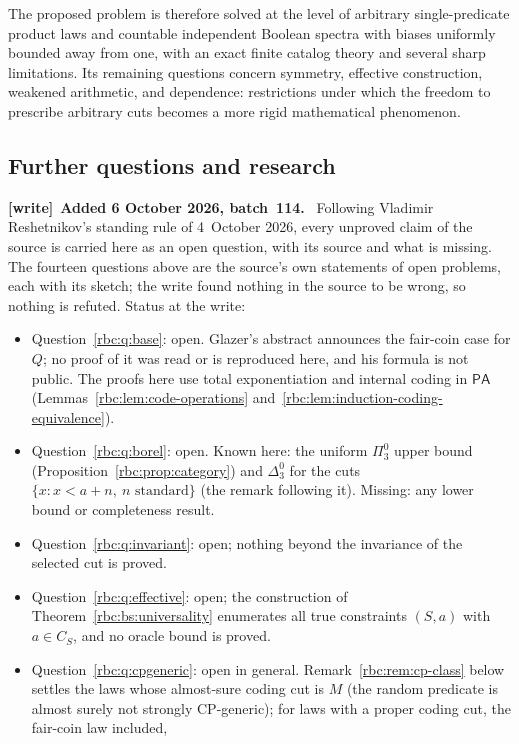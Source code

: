 \documentclass[11pt]{article}
\numberwithin{equation}{section}
\theoremstyle{definition}
\theoremstyle{remark}
\newcommand{\PA}{\mathsf{PA}}
\newenvironment{writenote}[1][]{\par\smallskip\begingroup\small
 \noindent\textbf{[write]}\if\relax\detokenize{#1}\relax\else~\textbf{#1.}\fi\ }%
 {\par\endgroup\smallskip}
\begin{document}
The proposed problem is therefore solved at the level of arbitrary
single-predicate product laws and countable independent Boolean spectra
with biases uniformly bounded away from one,
with an exact finite catalog theory and several sharp limitations. Its
remaining questions concern symmetry, effective construction, weakened
arithmetic, and dependence: restrictions under which the freedom to
prescribe arbitrary cuts becomes a more rigid mathematical phenomenon.

\subsection{Further questions and research}\label{rbc:sec:further}
\begin{writenote}[Added 6 October 2026, batch~114]
Following Vladimir Reshetnikov's standing rule of 4~October 2026, every
unproved claim of the source is carried here as an open question, with its
source and what is missing. The fourteen questions above are the source's
own statements of open problems, each with its sketch; the write found
nothing in the source to be wrong, so nothing is refuted. Status at the
write:
\begin{itemize}
\item Question~\ref{rbc:q:base}: open. Glazer's abstract announces the
 fair-coin case for $Q$; no proof of it was read or is reproduced here, and
 his formula is not public. The proofs here use total exponentiation and
 internal coding in $\PA$ (Lemmas~\ref{rbc:lem:code-operations}
 and~\ref{rbc:lem:induction-coding-equivalence}).
\item Question~\ref{rbc:q:borel}: open. Known here: the uniform $\Pi^0_3$
 upper bound (Proposition~\ref{rbc:prop:category}) and $\Delta^0_3$ for the
 cuts $\{x:x<a+n,\ n\text{ standard}\}$ (the remark following it). Missing:
 any lower bound or completeness result.
\item Question~\ref{rbc:q:invariant}: open; nothing beyond the invariance of
 the selected cut is proved.
\item Question~\ref{rbc:q:effective}: open; the construction of
 Theorem~\ref{rbc:bs:universality} enumerates all true constraints
 $(S,a)$ with $a\in C_S$, and no oracle bound is proved.
\item Question~\ref{rbc:q:cpgeneric}: open in general.
 Remark~\ref{rbc:rem:cp-class} below settles the laws whose almost-sure
 coding cut is $M$ (the random predicate is almost surely not strongly
 CP-generic); for laws with a proper coding cut, the fair-coin law included,

\end{itemize}
\end{writenote}
\end{document}
